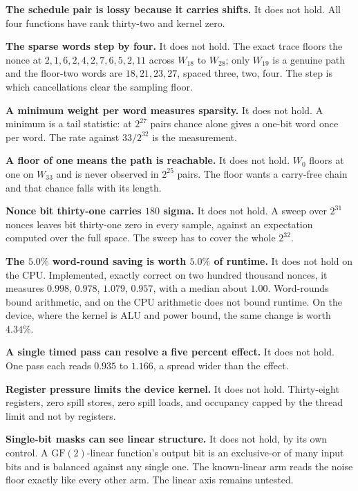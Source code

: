 \textbf{The schedule pair is lossy because it carries shifts.} It does not hold. All four functions have rank thirty-two and kernel zero.

\textbf{The sparse words step by four.} It does not hold. The exact trace floors the nonce at \(2, 1, 6, 2, 4, 2, 7, 6, 5, 2, 11\) across \(W_{18}\) to \(W_{28}\); only \(W_{19}\) is a genuine path and the floor-two words are \(18, 21, 23, 27\), spaced three, two, four. The step is which cancellations clear the sampling floor.

\textbf{A minimum weight per word measures sparsity.} It does not hold. A minimum is a tail statistic: at \(2^{27}\) pairs chance alone gives a one-bit word once per word. The rate against \(33/2^{32}\) is the measurement.

\textbf{A floor of one means the path is reachable.} It does not hold. \(W_0\) floors at one on \(W_{33}\) and is never observed in \(2^{25}\) pairs. The floor wants a carry-free chain and that chance falls with its length.

\textbf{Nonce bit thirty-one carries \(180\) sigma.} It does not hold. A sweep over \(2^{31}\) nonces leaves bit thirty-one zero in every sample, against an expectation computed over the full space. The sweep has to cover the whole \(2^{32}\).

\textbf{The \(5.0\%\) word-round saving is worth \(5.0\%\) of runtime.} It does not hold on the CPU. Implemented, exactly correct on two hundred thousand nonces, it measures \(0.998\), \(0.978\), \(1.079\), \(0.957\), with a median about \(1.00\). Word-rounds bound arithmetic, and on the CPU arithmetic does not bound runtime. On the device, where the kernel is ALU and power bound, the same change is worth \(4.34\%\).

\textbf{A single timed pass can resolve a five percent effect.} It does not hold. One pass each reads \(0.935\) to \(1.166\), a spread wider than the effect.

\textbf{Register pressure limits the device kernel.} It does not hold. Thirty-eight registers, zero spill stores, zero spill loads, and occupancy capped by the thread limit and not by registers.

\textbf{Single-bit masks can see linear structure.} It does not hold, by its own control. A \(\mathrm{GF}(2)\)-linear function's output bit is an exclusive-or of many input bits and is balanced against any single one. The known-linear arm reads the noise floor exactly like every other arm. The linear axis remains untested.

